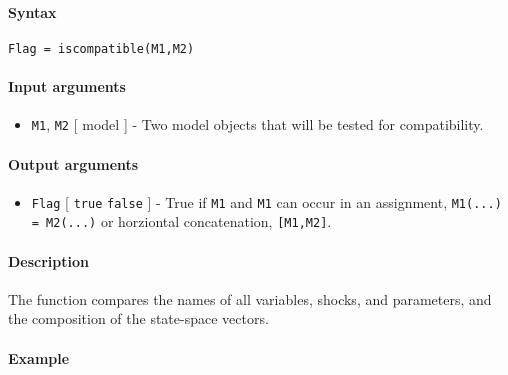 


	\paragraph{Syntax}\label{syntax}

\begin{verbatim}
Flag = iscompatible(M1,M2)
\end{verbatim}

\paragraph{Input arguments}\label{input-arguments}

\begin{itemize}
\itemsep1pt\parskip0pt
\item
  \texttt{M1}, \texttt{M2} {[} model {]} - Two model objects that will
  be tested for compatibility.
\end{itemize}

\paragraph{Output arguments}\label{output-arguments}

\begin{itemize}
\itemsep1pt\parskip0pt
\item
  \texttt{Flag} {[} \texttt{true} \textbar{} \texttt{false} {]} - True
  if \texttt{M1} and \texttt{M1} can occur in an assignment,
  \texttt{M1(...) = M2(...)} or horziontal concatenation,
  \texttt{{[}M1,M2{]}}.
\end{itemize}

\paragraph{Description}\label{description}

The function compares the names of all variables, shocks, and
parameters, and the composition of the state-space vectors.

\paragraph{Example}\label{example}


